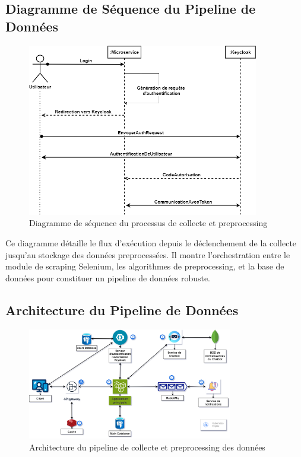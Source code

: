 \subsection{Diagramme de Séquence du Pipeline de Données}

\begin{figure}[H]
\centering
\includegraphics[width=0.9\textwidth]{assets/images/keycloak-seq.png}
\caption{Diagramme de séquence du processus de collecte et preprocessing}
\label{fig:data-pipeline-sequence}
\end{figure}

Ce diagramme détaille le flux d'exécution depuis le déclenchement de la collecte jusqu'au stockage des données preprocessées. Il montre l'orchestration entre le module de scraping Selenium, les algorithmes de preprocessing, et la base de données pour constituer un pipeline de données robuste.

\subsection{Architecture du Pipeline de Données}

\begin{figure}[H]
\centering
\includegraphics[width=0.8\textwidth]{assets/images/architecture.png}
\caption{Architecture du pipeline de collecte et preprocessing des données}
\label{fig:data-pipeline-architecture}
\end{figure}

